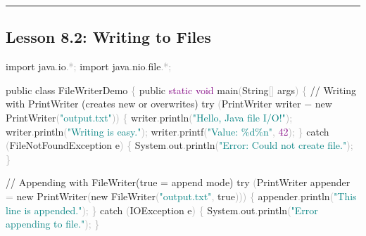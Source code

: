\documentclass[
  justified,
  openright,
]{tufte-book}
\newcommand{\BuiltInTok}[1]{#1}
\newcommand{\CommentTok}[1]{\textcolor{MidGray}{#1}}
\newcommand{\ControlFlowTok}[1]{\textcolor{BrandBlue}{#1}}
\newcommand{\DataTypeTok}[1]{\textcolor{Purple}{#1}}
\newcommand{\DecValTok}[1]{\textcolor{Purple}{#1}}
\newcommand{\FunctionTok}[1]{\textcolor{BrandBlue}{#1}}
\newcommand{\ImportTok}[1]{\textcolor{BrandAccent}{#1}}
\newcommand{\KeywordTok}[1]{\textcolor{BrandBlue}{#1}}
\newcommand{\NormalTok}[1]{#1}
\newcommand{\OperatorTok}[1]{\textcolor{DarkGray}{#1}}
\newcommand{\SpecialCharTok}[1]{\textcolor{Teal}{#1}}
\newcommand{\StringTok}[1]{\textcolor{Teal}{#1}}
\newenvironment{Shaded}{%
  \begin{snugshade}
}{%
  \end{snugshade}
}
\begin{document}
\begin{center}\rule{0.5\linewidth}{0.5pt}\end{center}

\subsection{Lesson 8.2: Writing to
Files}\label{lesson-8.2-writing-to-files}

\begin{Shaded}
\begin{Highlighting}[]
\KeywordTok{import} \ImportTok{java}\OperatorTok{.}\ImportTok{io}\OperatorTok{.*;}
\KeywordTok{import} \ImportTok{java}\OperatorTok{.}\ImportTok{nio}\OperatorTok{.}\ImportTok{file}\OperatorTok{.*;}

\KeywordTok{public} \KeywordTok{class}\NormalTok{ FileWriterDemo }\OperatorTok{\{}
    \KeywordTok{public} \DataTypeTok{static} \DataTypeTok{void} \FunctionTok{main}\OperatorTok{(}\BuiltInTok{String}\OperatorTok{[]}\NormalTok{ args}\OperatorTok{)} \OperatorTok{\{}
        \CommentTok{// Writing with PrintWriter (creates new or overwrites)}
        \ControlFlowTok{try} \OperatorTok{(}\BuiltInTok{PrintWriter}\NormalTok{ writer }\OperatorTok{=} \KeywordTok{new} \BuiltInTok{PrintWriter}\OperatorTok{(}\StringTok{"output.txt"}\OperatorTok{))} \OperatorTok{\{}
\NormalTok{            writer}\OperatorTok{.}\FunctionTok{println}\OperatorTok{(}\StringTok{"Hello, Java file I/O!"}\OperatorTok{);}
\NormalTok{            writer}\OperatorTok{.}\FunctionTok{println}\OperatorTok{(}\StringTok{"Writing is easy."}\OperatorTok{);}
\NormalTok{            writer}\OperatorTok{.}\FunctionTok{printf}\OperatorTok{(}\StringTok{"Value: }\SpecialCharTok{\%d\%n}\StringTok{"}\OperatorTok{,} \DecValTok{42}\OperatorTok{);}
        \OperatorTok{\}} \ControlFlowTok{catch} \OperatorTok{(}\BuiltInTok{FileNotFoundException}\NormalTok{ e}\OperatorTok{)} \OperatorTok{\{}
            \BuiltInTok{System}\OperatorTok{.}\FunctionTok{out}\OperatorTok{.}\FunctionTok{println}\OperatorTok{(}\StringTok{"Error: Could not create file."}\OperatorTok{);}
        \OperatorTok{\}}

        \CommentTok{// Appending with FileWriter(true = append mode)}
        \ControlFlowTok{try} \OperatorTok{(}\BuiltInTok{PrintWriter}\NormalTok{ appender }\OperatorTok{=} \KeywordTok{new} \BuiltInTok{PrintWriter}\OperatorTok{(}\KeywordTok{new} \BuiltInTok{FileWriter}\OperatorTok{(}\StringTok{"output.txt"}\OperatorTok{,} \KeywordTok{true}\OperatorTok{)))} \OperatorTok{\{}
\NormalTok{            appender}\OperatorTok{.}\FunctionTok{println}\OperatorTok{(}\StringTok{"This line is appended."}\OperatorTok{);}
        \OperatorTok{\}} \ControlFlowTok{catch} \OperatorTok{(}\BuiltInTok{IOException}\NormalTok{ e}\OperatorTok{)} \OperatorTok{\{}
            \BuiltInTok{System}\OperatorTok{.}\FunctionTok{out}\OperatorTok{.}\FunctionTok{println}\OperatorTok{(}\StringTok{"Error appending to file."}\OperatorTok{);}
        \OperatorTok{\}}


\end{Highlighting}
\end{Shaded}
\end{document}
